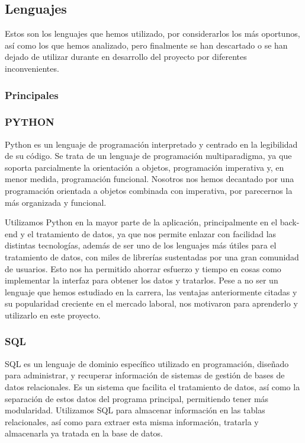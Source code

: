 \subsection{Lenguajes} 

Estos son los lenguajes que hemos utilizado, por considerarlos los más oportunos, así como los que hemos analizado, pero finalmente se han descartado o se han dejado de utilizar durante en desarrollo del proyecto por diferentes inconvenientes.

	\subsubsection{Principales}
	\subsubsection*{PYTHON}
		Python es un lenguaje de programación interpretado y centrado en la legibilidad de su código. Se trata de un lenguaje de programación multiparadigma, ya que soporta parcialmente la orientación a objetos, programación imperativa y, en menor medida, programación funcional. Nosotros nos hemos decantado por una programación orientada a objetos combinada con imperativa, por parecernos la más organizada y funcional.
		
		Utilizamos Python en la mayor parte de la aplicación, principalmente en el back-end y el tratamiento de datos, ya que nos permite enlazar con facilidad las distintas tecnologías, además de ser uno de los lenguajes más útiles para el tratamiento de datos, con miles de librerías sustentadas por una gran comunidad de usuarios. Esto nos ha permitido ahorrar esfuerzo y tiempo en cosas como implementar la interfaz para obtener los datos y tratarlos. Pese a no ser un lenguaje que hemos estudiado en la carrera, las ventajas anteriormente citadas y su popularidad creciente en el mercado laboral, nos motivaron para aprenderlo y utilizarlo en este proyecto. 
		
	\subsubsection*{SQL}
		SQL es un lenguaje de dominio específico utilizado en programación, diseñado para administrar, y recuperar información de sistemas de gestión de bases de datos relacionales. Es un sistema que facilita el tratamiento de datos, así como la separación de estos datos del programa principal, permitiendo tener más modularidad.
		Utilizamos SQL para almacenar información en las tablas relacionales, así como para extraer esta misma información, tratarla y almacenarla ya tratada en la base de datos. 
		
